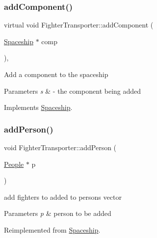 \subsubsection{\texorpdfstring{add\+Component()}{addComponent()}}
{\footnotesize\ttfamily virtual void Fighter\+Transporter\+::add\+Component (\begin{DoxyParamCaption}\item[{\hyperlink{classSpaceship}{Spaceship} $\ast$}]{comp }\end{DoxyParamCaption})\hspace{0.3cm}{\ttfamily [inline]}, {\ttfamily [virtual]}}

Add a component to the spaceship 
\begin{DoxyParams}{Parameters}
{\em s} & -\/ the component being added \\
\hline
\end{DoxyParams}


Implements \hyperlink{classSpaceship_ac1b4673a691cd100708ddea08cd9f192}{Spaceship}.

\mbox{\label{classFighterTransporter_a79b9099ea2cbdd17d1a0d6c8122e9bfa}} 
\subsubsection{\texorpdfstring{add\+Person()}{addPerson()}}
{\footnotesize\ttfamily void Fighter\+Transporter\+::add\+Person (\begin{DoxyParamCaption}\item[{\hyperlink{classPeople}{People} $\ast$}]{p }\end{DoxyParamCaption})\hspace{0.3cm}{\ttfamily [virtual]}}

add fighters to added to persons vector 
\begin{DoxyParams}{Parameters}
{\em p} & person to be added \\
\hline
\end{DoxyParams}


Reimplemented from \hyperlink{classSpaceship_add8d9c6dfd5f6ecb8399e41e71e5b22f}{Spaceship}.

\mbox{\label{classFighterTransporter_ae4191358a54d0f30476beea30aa16317}} 

